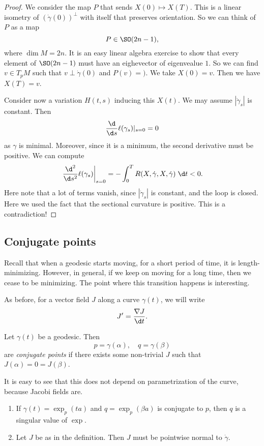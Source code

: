 \documentclass[a4paper]{article}
\begin{document}
\begin{proof}
  We consider the map $P$ that sends $X(0) \mapsto X(T)$. This is a linear isometry of $(\dot{\gamma}(0))^\perp$ with itself that preserves orientation. So we can think of $P$ as a map
  \[
    P \in \SO(2n - 1),
  \]
  where $\dim M = 2n$. It is an easy linear algebra exercise to show that every element of $\SO(2n - 1)$ must have an eighevector of eigenvealue $1$. So we can find $v \in T_p M$ such that $v \perp \dot{\gamma}(0)$ and $P(v) = )$. We take $X(0) = v$. Then we have $X(T) = v$.

  Consider now a variation $H(t, s)$ inducing this $X(t)$. We may assume $|\dot{\gamma}_s|$ is constant. Then
  \[
    \frac{\d}{\d s} \ell(\gamma_s)|_{s = 0} = 0
  \]
  as $\gamma$ is minimal. Moreover, since it is a minimum, the second derivative must be positive. We can compute
  \[
    \left.\frac{\d^2}{\d s^2} \ell(\gamma_s)\right|_{s = 0} = - \int_0^T R(X, \dot{\gamma}, X, \dot{\gamma})\;\d t < 0.
  \]
  Here note that a lot of terms vanish, since $|\dot{\gamma}_s|$ is constant, and the loop is closed. Here we used the fact that the sectional curvature is positive. This is a contradiction!
\end{proof}
\subsection{Conjugate points}
Recall that when a geodesic starts moving, for a short period of time, it is length-minimizing. However, in general, if we keep on moving for a long time, then we cease to be minimizing. The point where this transition happens is interesting.

As before, for a vector field $J$ along a curve $\gamma(t)$, we will write
\[
  J' = \frac{\nabla J}{\d t}.
\]
\begin{defi}
  Let $\gamma(t)$ be a geodesic. Then
  \[
    p = \gamma(\alpha), \quad q = \gamma(\beta)
  \]
  are \emph{conjugate points} if there exists some non-trivial $J$ such that $J(\alpha) = 0 = J(\beta)$.
\end{defi}
It is easy to see that this does not depend on parametrization of the curve, because Jacobi fields are.

\begin{prop}\leavevmode
  \begin{enumerate}
    \item If $\gamma(t) = \exp_p(t a)$ and $q = \exp_p(\beta a)$ is conjugate to $p$, then $q$ is a singular value of $\exp$.
    \item Let $J$ be as in the definition. Then $J$ must be pointwise normal to $\dot{\gamma}$.
  \end{enumerate}
\end{prop}
\end{document}
